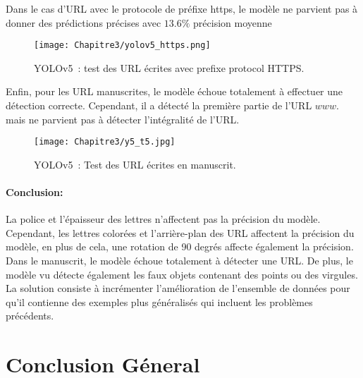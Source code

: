      Dans le cas d'URL avec le protocole de préfixe https, le modèle ne parvient pas à donner des prédictions précises avec $13.6\%$ précision moyenne
     \begin{figure}[H]
               \centering
               \texttt{[image: Chapitre3/yolov5\_https.png]}
               \caption{YOLOv5 : test des URL écrites avec prefixe protocol HTTPS.}
               \label{y5_https}
               \end{figure}
     

     Enfin, pour les URL manuscrites, le modèle échoue totalement à effectuer une détection correcte. Cependant, il a détecté la première partie de l'URL $www.$ mais ne parvient pas à détecter l'intégralité de l'URL.
     \begin{figure}[H]
               \centering
               \texttt{[image: Chapitre3/y5\_t5.jpg]}
               \caption{YOLOv5 : Test des URL écrites en manuscrit.}
               \label{y5_t5}
               \end{figure}

     \paragraph{Conclusion:} La police et l'épaisseur des lettres n'affectent pas la précision du modèle. Cependant, les lettres colorées et l'arrière-plan des URL affectent la précision du modèle, en plus de cela, une rotation de 90 degrés affecte également la précision. Dans le manuscrit, le modèle échoue totalement à détecter une URL. De plus, le modèle vu détecte également les faux objets contenant des points ou des virgules.
     La solution consiste à incrémenter l'amélioration de l'ensemble de données pour qu'il contienne des exemples plus généralisés qui incluent les problèmes précédents.

\section{Conclusion Géneral}
